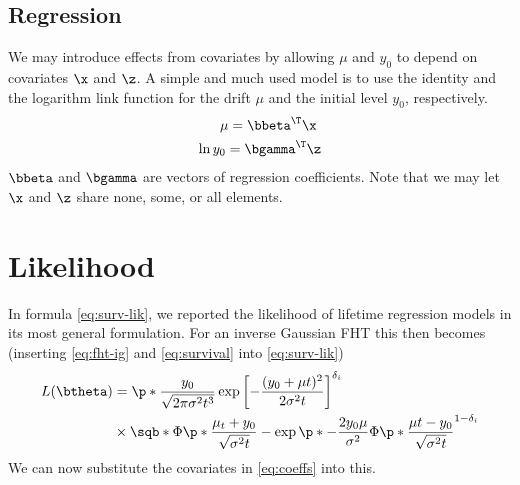 \subsection{Regression}
We may introduce effects from covariates by allowing $\mu$ and $y_0$ to depend on covariates $\x$ and $\z$. A simple and much used model is to use the identity and the logarithm link function for the drift $\mu$ and the initial level $y_0$, respectively.
\begin{align}\label{eq:coeffs}
\begin{split}
    \mu=\bbeta^\T\x \\
    \ln y_0=\bgamma^\T\z
\end{split}
\end{align}
$\bbeta$ and $\bgamma$ are vectors of regression coefficients. Note that we may let $\x$ and $\z$ share none, some, or all elements.

\section{Likelihood}\label{sec:lik}
In formula \eqref{eq:surv-lik}, we reported the likelihood of lifetime regression models in its most general formulation. For an inverse Gaussian FHT this then becomes (inserting \eqref{eq:fht-ig} and \eqref{eq:survival} into \eqref{eq:surv-lik})
\begin{align}\label{eq:fht-lik}
\begin{split}
L(\btheta)&=\p*{\frac{y_0}{\sqrt{2\pi\sigma^2t^3}}\exp\left[-\frac{(y_0+\mu t)^2}{2\sigma^2t}\right]}^{\delta_i}\\
&\times\sqb*{\Phi\p*{\frac{\mu_t+y_0}{\sqrt{\sigma^2t}}}-\exp\p*{-\frac{2y_0\mu}{\sigma^2}}\Phi\p*{\frac{\mu t-y_0}{\sqrt{\sigma^2t}}}}^{1-\delta_i}
\end{split}
\end{align}
We can now substitute the covariates in \eqref{eq:coeffs} into this.

